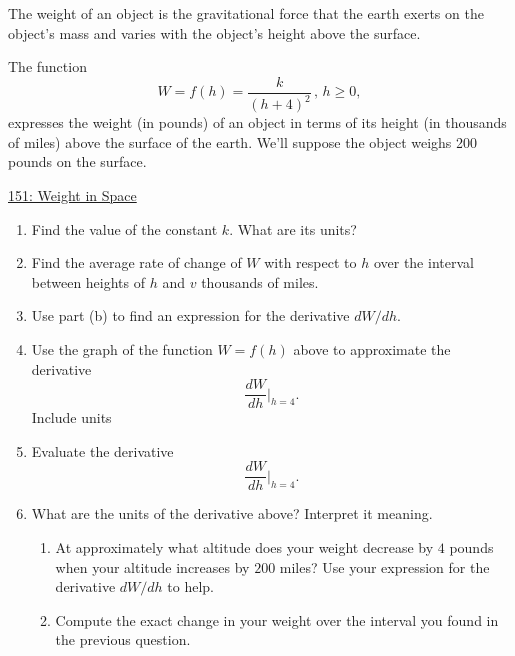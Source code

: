 \documentclass{ximera}
\begin{document}
\begin{question}  \label{Q9df9tthhhg}

The weight of an object is the gravitational force that the earth exerts on the object's mass and varies with the object's height above the surface.

The function 
\[
  W = f(h) = \frac{k}{(h+4)^2} \, , \, h\geq 0,
\]
expresses the weight (in pounds) of an object in terms of its height (in thousands of miles) above the surface of the earth. We'll suppose the object weighs 200 pounds on the surface.

\begin{onlineOnly}
    \begin{center}
\end{center}
\end{onlineOnly}

\href{https://www.desmos.com/calculator/zklsucctjp}{151: Weight in Space}


\begin{enumerate}
\item Find the value of the constant $k$. What are its units?

\item Find the average rate of change of $W$ with respect to $h$ over the interval between heights of $h$ and $v$ thousands of miles.

\item Use part (b) to find an expression for the derivative $dW/dh$.

\item Use the graph of the function $W=f(h)$ above to approximate the derivative
\[
      \frac{dW}{dh}\Big|_{h=4}.
\]
Include units

\item Evaluate the derivative
\[
      \frac{dW}{dh}\Big|_{h=4}.
\]

\item What are the units of the derivative above? Interpret it meaning.

\begin{enumerate}

\item At approximately what altitude does your weight decrease by $4$ pounds when your altitude increases by $200$ miles? Use your expression for the derivative $dW/dh$ to help. 

\item Compute the exact change in your weight over the interval you found in the previous question.
\end{enumerate}

\end{enumerate}

\end{question}
\end{document}
